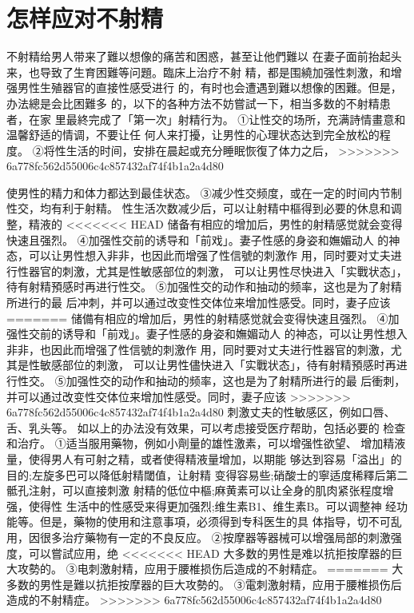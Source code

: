 \documentclass[12pt,UTF8]{ctexbook}
\begin{document}
\section{怎样应对不射精}
不射精给男人带来了難以想像的痛苦和困惑，甚至让他們難以
在妻子面前抬起头来，也导致了生育困難等问題。臨床上治疗不射
精，都是围繞加强性刺激，和增强男性生殖器官的直接性感受进行
的，有时也会遭遇到難以想像的困難。但是，办法總是会比困難多
的，以下的各种方法不妨嘗試一下，相当多数的不射精患者，在家
里最終完成了「第一次」射精行为。
①让性交的场所，充满詩情畫意和温馨舒适的情调，不要让任
何人来打擾，让男性的心理状态达到完全放松的程度。
②将性生活的时间，安排在晨起或充分睡眠恢復了体力之后，
>>>>>>> 6a778fc562d55006c4c857432af74f4b1a2a4d80

使男性的精力和体力都达到最佳状态。
③减少性交频度，或在一定的时间内节制性交，均有利于射精。
性生活次数减少后，可以让射精中樞得到必要的休息和调整，精液的
<<<<<<< HEAD
储备有相应的增加后，男性的射精感觉就会变得快速且强烈。
④加强性交前的诱导和「前戏」。妻子性感的身姿和嫵媚动人
的神态，可以让男性想入非非，也因此而增强了性信號的刺激作
用，同时要对丈夫进行性器官的刺激，尤其是性敏感部位的刺激，
可以让男性尽快进入「实戰状态」，待有射精預感时再进行性交。
⑤加强性交的动作和抽动的频率，这也是为了射精所进行的最
后冲刺，并可以通过改变性交体位来增加性感受。同时，妻子应该
=======
储備有相应的增加后，男性的射精感觉就会变得快速且强烈。
④加强性交前的诱导和「前戏」。妻子性感的身姿和嫵媚动人
的神态，可以让男性想入非非，也因此而增强了性信號的刺激作
用，同时要对丈夫进行性器官的刺激，尤其是性敏感部位的刺激，
可以让男性儘快进入「实戰状态」，待有射精預感时再进行性交。
⑤加强性交的动作和抽动的频率，这也是为了射精所进行的最
后衝刺，并可以通过改变性交体位来增加性感受。同时，妻子应该
>>>>>>> 6a778fc562d55006c4c857432af74f4b1a2a4d80
刺激丈夫的性敏感区，例如口唇、舌、乳头等。
如以上的办法没有效果，可以考虑接受医疗帮助，包括必要的
检查和治疗。
①适当服用藥物，例如小劑量的雄性激素，可以增强性欲望、
增加精液量，使得男人有可射之精，或者使得精液量增加，以期能
够达到容易「溢出」的目的;左旋多巴可以降低射精閾值，让射精
变得容易些;硝酸士的寧适度稀釋后第二骶孔注射，可以直接刺激
射精的低位中樞;麻黄素可以让全身的肌肉紧张程度增强，使得性
生活中的性感受来得更加强烈;维生素B1、维生素B。可以调整神
经功能等。但是，藥物的使用和注意事項，必须得到专科医生的具
体指导，切不可乱用，因很多治疗藥物有一定的不良反应。
②按摩器等器械可以增强局部的刺激强度，可以嘗試应用，绝
<<<<<<< HEAD
大多数的男性是难以抗拒按摩器的巨大攻勢的。
③电刺激射精，应用于腰椎损伤后造成的不射精症。
=======
大多数的男性是難以抗拒按摩器的巨大攻勢的。
③電刺激射精，应用于腰椎损伤后造成的不射精症。
>>>>>>> 6a778fc562d55006c4c857432af74f4b1a2a4d80
\end{document}
